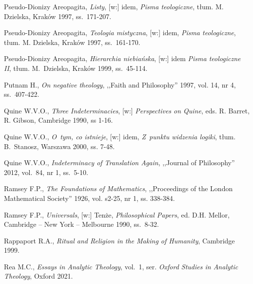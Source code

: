 \begin{thebibliography}{100}
Pseudo-Dionizy Areopagita, \textit{Listy}, [w:] idem, \textit{Pisma teologiczne}, tłum. M. Dzielska, Kraków 1997, ss.~171-207.

Pseudo-Dionizy Areopagita, \textit{Teologia mistyczna}, [w:] idem, \textit{Pisma teologiczne}, tłum. M. Dzielska, Kraków 1997, ss.~161-170.

Pseudo-Dionizy Areopagita, \textit{Hierarchia niebiańska}, [w:] idem  \textit{Pisma teologiczne II}, tłum. M.~Dzielska, Kraków 1999, ss.~45-114.


Putnam H., \textit{On negative theology}, ,,Faith and Philosophy'' 1997, vol. 14, nr 4, ss.~407-422.

Quine W.V.O., \textit{Three Indeterminacies}, [w:] \textit{Perspectives on Quine}, eds. R. Barret, R. Gibson, Cambridge 1990, ss 1-16.

Quine W.V.O., \textit{O~tym, co istnieje}, [w:] idem, \textit{Z~punktu widzenia logiki}, tłum. B.~Stanosz, Warszawa 2000, ss. 7-48.

Quine W.V.O., \textit{Indeterminacy of Translation Again}, ,,Journal of Philosophy'' 2012, vol.~84, nr 1, ss.~5-10.

Ramsey F.P., \textit{The Foundations of Mathematics}, ,,Proceedings of the London Mathematical Society'' 1926, vol. s2-25, nr 1, ss. 338-384.

Ramsey F.P., \textit{Universals}, [w:] Tenże, \textit{Philosophical Papers}, ed. D.H. Mellor, Cambridge -- New York -- Melbourne 1990, ss.~8-32.

Rappaport R.A., \textit{Ritual and Religion in the Making of Humanity}, Cambridge 1999.

Rea M.C., \textit{Essays in Analytic Theology}, vol.~1, ser. \textit{Oxford Studies in Analytic Theology}, Oxford 2021.



\end{thebibliography}
